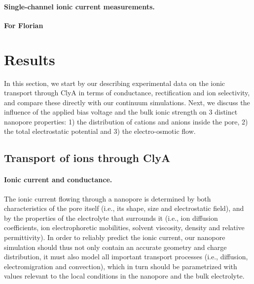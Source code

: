 \documentclass[journal=ancac3, manuscript=article, etalmode=truncate,maxauthors=0]{achemso}
\begin{document}
\paragraph{Single-channel ionic current measurements.}
\textbf{For Florian}

\newpage
\section{Results}\label{sect:results}
In this section, we start by our describing experimental data on the ionic transport through ClyA in terms of 
conductance, rectification and ion selectivity, and compare these directly with our continuum simulations. 
Next, we discuss the influence of the applied bias voltage and the bulk ionic strength on 3 distinct nanopore 
properties: 1) the distribution of cations and anions inside the pore, 2) the total electrostatic potential 
and 3) the electro-osmotic flow. 



\subsection{Transport of ions through ClyA}

\paragraph{Ionic current and conductance.}
The ionic current flowing through a nanopore is determined by both characteristics of the pore itself (i.e., 
its shape, size and electrostatic field), and by the properties of the electrolyte that surrounds it (i.e., 
ion diffusion coefficients, ion electrophoretic mobilities, solvent viscosity, density and relative 
permittivity). In order to reliably predict the ionic current, our nanopore simulation should thus not only 
contain an accurate geometry and charge distribution, it must also model all important transport processes 
(i.e., diffusion, electromigration and convection), which in turn should be parametrized with values relevant 
to the local conditions in the nanopore and the bulk electrolyte.
\end{document}
